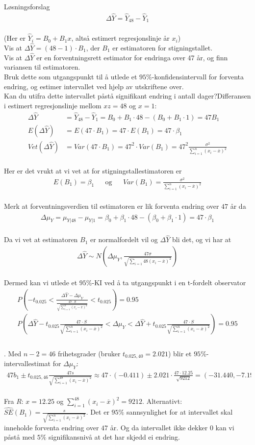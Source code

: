 \documentclass[final,hyperref={pdfpagelabels=false}]{beamer}
\newcommand{\maths}[1]{\vspace{-3mm}\begin{align*}#1\end{align*}\\\vspace{-3mm}}
\newcommand{\ol}[0]{\overline}
\begin{document}
\begin{frame}{}
\begin{columns}[t]
\begin{column}{.50\linewidth}
\begin{block}{Løsningsforslag}
{					\maths{\Delta\hat Y=\hat Y_{48} - \hat Y_1}
					(Her er $\hat Y_i = B_0 + B_1 x$, altså estimert regresjonslinje år $x_i$)\\
					Vis at $\Delta\hat Y=(48-1)\cdot B_1$, der $B_1$ er estimatoren for stigningstallet.\\
					Vis at $\Delta\hat Y$ er en forventningsrett estimator for endringa over 47 år, og finn variansen til estimatoren.\\
					Bruk dette som utgangspunkt til å utlede et $95\%$-konfidensintervall for forventa endring, og estimer intervallet ved hjelp av utskriftene over.\\
					Kan du utifra dette intervallet påstå signifikant endring i antall dager?}{Differansen i estimert regresjonslinje mellom $xz=48$ og $x=1$:
					\maths{\Delta\hat Y&= \hat Y_{48}-\hat Y_1 = B_0+B_1\cdot 48-(B_0+B_1\cdot 1)=47 B_1\\
						E(\Delta\hat Y)&=E(47\cdot B_1)=47\cdot E(B_1)=47\cdot \beta_1\\
						Vet(\Delta\hat Y)&= Var(47\cdot B_1)=47^2\cdot Var(B_1)=47^2\frac{\sigma^2}{\sum_{i=1}^n(x_i-\ol x)^2}}
					Her er det vrukt at vi vet at for stigningstallestimatoren er
					\maths{E(B_1)=\beta_1&&\text{og}&&Var(B_1)=\frac{\sigma^2}{\sum_{i=1}^n(x_i-\ol x)^2}}
					Merk at forventningsverdien til estimatoren er lik forventa endring over $47$ år da
					\maths{\Delta\mu_Y=\mu_{Y|48}-\mu_{Y|1}=\beta_0+\beta_1\cdot 48-(\beta_0 + \beta_1 \cdot 1)=47\cdot\beta_1}
					Da vi vet at estimatoren $B_1$ er normalfordelt vil og $\Delta\hat Y$ bli det, og vi har at
					\maths{\Delta\hat Y\sim N\left(\Delta\mu_Y,\frac{47\sigma}{\sqrt{\sum_{i=1}{48}(x_i-\ol x)^2}}\right)}
					Dermed kan vi utlede et $95\%$-KI ved å ta utgangspunkt i en t-fordelt observator
					\maths{P\left(-t_{0.025}<\frac{\Delta\hat Y-\Delta\mu_Y}{\frac{47\cdot S}{\sqrt{\sum_{i=1}^n(x_i-\ol x)^2}}}<t_{0.025}\right)=0.95\\
						P\left(\Delta\hat Y-t_{0.025}\frac{47\cdot S}{\sqrt{\sum_{i=1}^n(x_i-\ol x)^2}}<\Delta\mu_Y<\Delta\hat Y+t_{0.025}\frac{47\cdot S}{\sqrt{\sum_{i=1}^n(x_i-\ol x)^2}}\right)=0.95\\}.
			Med $n-2=46$ frihetsgrader (bruker $t_{0.025,40}=2.021$) blir et $95\%$-intervallestimat for $\Delta\mu_Y$:
				\maths{47b_1\pm t_{0.025,46}\frac{47s}{\sqrt{\sum_{i=1}^48(x_i-\ol x)^2}}\approx 47 \cdot (-0.411)\pm 2.021 \cdot \frac{47\cdot 12.25}{\sqrt{9212}}=(-31.440,-7.193)}
				Fra $R$: $x=12.25$ og $\sum_{i=1}^{48}(x_i-\ol x)^2=9212$. Alternativt: $\hat{SE}(B_1)=\frac{s}{\sqrt{\sum_{i=1}^n(x_i-\ol x)^2}}$. Det er $95\%$ sannsynlighet for at intervallet skal inneholde forventa endring over $47$ år. Og da intervallet ikke dekker $0$ kan vi påstå med $5\%$ signifikansnivå at det har skjedd ei endring.
}
\end{block}
\end{column}
\end{columns}
\end{frame}
\end{document}
